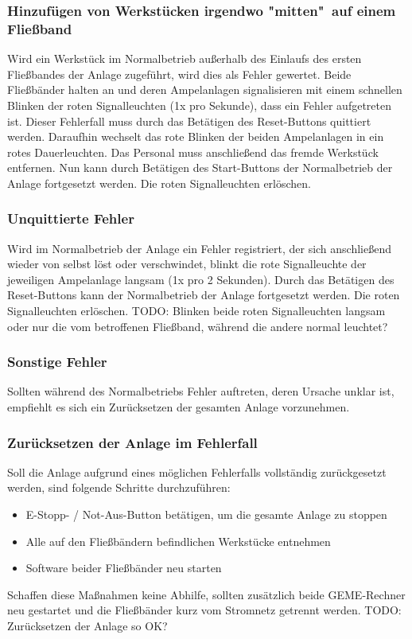 \documentclass[oneside,a4paper,titlepage]{scrartcl} %
\begin{document}
\subsubsection{Hinzufügen von Werkstücken irgendwo "mitten"\ auf einem Fließband}
Wird ein Werkstück im Normalbetrieb außerhalb des Einlaufs des ersten Fließbandes der Anlage zugeführt, wird dies als Fehler gewertet. Beide Fließbänder halten an und deren Ampelanlagen signalisieren mit einem schnellen Blinken der roten Signalleuchten (1x pro Sekunde), dass ein Fehler aufgetreten ist. Dieser Fehlerfall muss durch das Betätigen des Reset-Buttons quittiert werden. Daraufhin wechselt das rote Blinken der beiden Ampelanlagen in ein rotes Dauerleuchten. Das Personal muss anschließend das fremde Werkstück entfernen. Nun kann durch Betätigen des Start-Buttons der Normalbetrieb der Anlage fortgesetzt werden. Die roten Signalleuchten erlöschen.

\subsubsection{Unquittierte Fehler}
Wird im Normalbetrieb der Anlage ein Fehler registriert, der sich anschließend wieder von selbst löst oder verschwindet, blinkt die rote Signalleuchte der jeweiligen Ampelanlage langsam (1x pro 2 Sekunden). Durch das Betätigen des Reset-Buttons kann der Normalbetrieb der Anlage fortgesetzt werden. Die roten Signalleuchten erlöschen.
\newline TODO: Blinken beide roten Signalleuchten langsam oder nur die vom betroffenen Fließband, während die andere normal leuchtet? 

\subsubsection{Sonstige Fehler}
Sollten während des Normalbetriebs Fehler auftreten, deren Ursache unklar ist, empfiehlt es sich ein Zurücksetzen der gesamten Anlage vorzunehmen. 

\subsubsection{Zurücksetzen der Anlage im Fehlerfall}
Soll die Anlage aufgrund eines möglichen Fehlerfalls vollständig zurückgesetzt werden, sind folgende Schritte durchzuführen:
\begin{itemize}
  \item E-Stopp- / Not-Aus-Button betätigen, um die gesamte Anlage zu stoppen
  \item Alle auf den Fließbändern befindlichen Werkstücke entnehmen
  \item Software beider Fließbänder neu starten  
\end{itemize}
Schaffen diese Maßnahmen keine Abhilfe, sollten zusätzlich beide GEME-Rechner neu gestartet und die Fließbänder kurz vom Stromnetz getrennt werden.
\newline TODO: Zurücksetzen der Anlage so OK?
\end{document}
